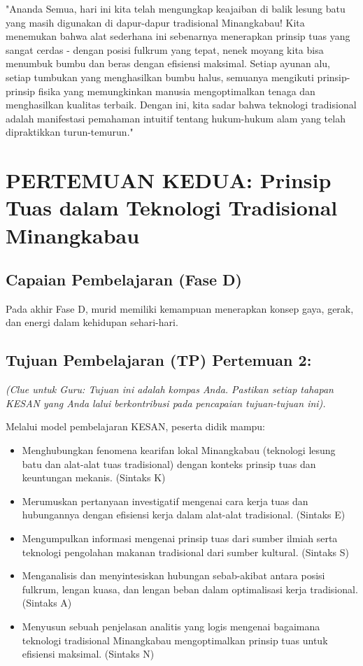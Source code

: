 \documentclass[a4paper,12pt]{article}
\begin{document}
\begin{tcolorbox}[sectionbox]
"Ananda Semua, hari ini kita telah mengungkap keajaiban di balik lesung batu yang masih digunakan di dapur-dapur tradisional Minangkabau! Kita menemukan bahwa alat sederhana ini sebenarnya menerapkan prinsip tuas yang sangat cerdas - dengan posisi fulkrum yang tepat, nenek moyang kita bisa menumbuk bumbu dan beras dengan efisiensi maksimal. Setiap ayunan alu, setiap tumbukan yang menghasilkan bumbu halus, semuanya mengikuti prinsip-prinsip fisika yang memungkinkan manusia mengoptimalkan tenaga dan menghasilkan kualitas terbaik. Dengan ini, kita sadar bahwa teknologi tradisional adalah manifestasi pemahaman intuitif tentang hukum-hukum alam yang telah dipraktikkan turun-temurun."
\end{tcolorbox}

\section{PERTEMUAN KEDUA: Prinsip Tuas dalam Teknologi Tradisional Minangkabau}

\subsection{Capaian Pembelajaran (Fase D)}
Pada akhir Fase D, murid memiliki kemampuan menerapkan konsep gaya, gerak, dan energi dalam kehidupan sehari-hari.

\subsection{Tujuan Pembelajaran (TP) Pertemuan 2:}
\textit{(Clue untuk Guru: Tujuan ini adalah kompas Anda. Pastikan setiap tahapan KESAN yang Anda lalui berkontribusi pada pencapaian tujuan-tujuan ini).}

Melalui model pembelajaran KESAN, peserta didik mampu:
\begin{itemize}
\item Menghubungkan fenomena kearifan lokal Minangkabau (teknologi lesung batu dan alat-alat tuas tradisional) dengan konteks prinsip tuas dan keuntungan mekanis. (Sintaks K)
\item Merumuskan pertanyaan investigatif mengenai cara kerja tuas dan hubungannya dengan efisiensi kerja dalam alat-alat tradisional. (Sintaks E)
\item Mengumpulkan informasi mengenai prinsip tuas dari sumber ilmiah serta teknologi pengolahan makanan tradisional dari sumber kultural. (Sintaks S)
\item Menganalisis dan menyintesiskan hubungan sebab-akibat antara posisi fulkrum, lengan kuasa, dan lengan beban dalam optimalisasi kerja tradisional. (Sintaks A)
\item Menyusun sebuah penjelasan analitis yang logis mengenai bagaimana teknologi tradisional Minangkabau mengoptimalkan prinsip tuas untuk efisiensi maksimal. (Sintaks N)
\end{itemize}
\end{document}
